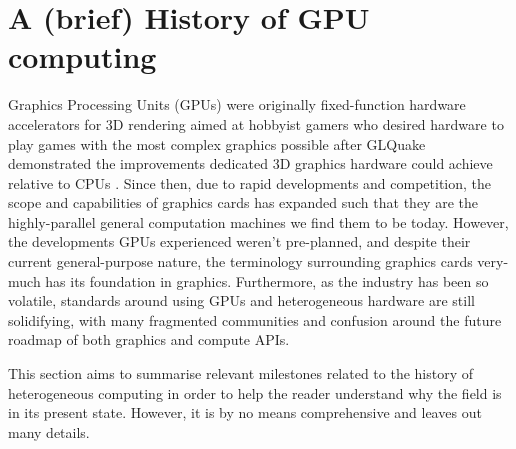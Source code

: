 \documentclass[a4paper,12pt,twoside,openright]{report}
\begin{document}



\section{A (brief) History of GPU computing}

\label{sec:history_gpu}

Graphics Processing Units (GPUs) were originally fixed-function hardware
accelerators for 3D rendering aimed at hobbyist gamers who desired hardware to
play games with the most complex graphics possible after GLQuake demonstrated
the improvements dedicated 3D graphics hardware could achieve relative to CPUs
\cite{GLQuake}. Since then, due to rapid developments and competition, the
scope and capabilities of graphics cards has expanded such that they are the
highly-parallel general computation machines we find them to be today. However,
the developments GPUs experienced weren't pre-planned, and despite their
current general-purpose nature, the terminology surrounding graphics cards
very-much has its foundation in graphics. Furthermore, as the industry has been
so volatile, standards around using GPUs and heterogeneous hardware are still
solidifying, with many fragmented communities and confusion around the future
roadmap of both graphics and compute APIs.

This section aims to summarise relevant milestones related to the history of
heterogeneous computing in order to help the reader understand why the field is
in its present state. However, it is by no means comprehensive and leaves out
many details.
\end{document}
